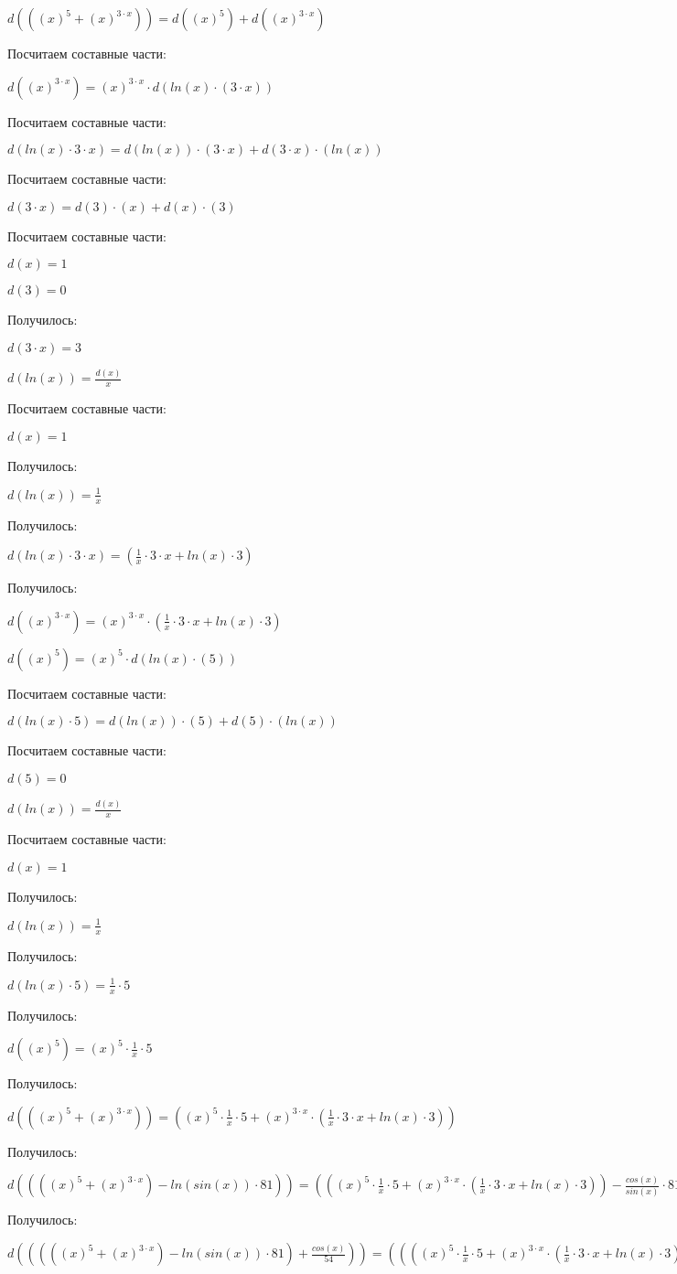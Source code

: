 \documentclass{article}
\begin{document}
$ d(((x)^{5}+(x)^{3 \cdot x})) = d((x)^{5}) + d((x)^{3 \cdot x})$

Посчитаем составные части:

$ d((x)^{3 \cdot x}) = (x)^{3 \cdot x} \cdot d(ln(x) \cdot (3 \cdot x))$

Посчитаем составные части:

$ d(ln(x) \cdot 3 \cdot x) = d(ln(x)) \cdot (3 \cdot x) + d(3 \cdot x) \cdot (ln(x))$

Посчитаем составные части:

$ d(3 \cdot x) = d(3) \cdot (x) + d(x) \cdot (3)$

Посчитаем составные части:

$ d(x) = 1$

$ d(3) = 0$

Получилось:

$ d(3 \cdot x) = 3$

$ d(ln(x)) = \frac{d(x)}{x}$

Посчитаем составные части:

$ d(x) = 1$

Получилось:

$ d(ln(x)) = \frac{1}{x}$

Получилось:

$ d(ln(x) \cdot 3 \cdot x) = (\frac{1}{x} \cdot 3 \cdot x+ln(x) \cdot 3)$

Получилось:

$ d((x)^{3 \cdot x}) = (x)^{3 \cdot x} \cdot (\frac{1}{x} \cdot 3 \cdot x+ln(x) \cdot 3)$

$ d((x)^{5}) = (x)^{5} \cdot d(ln(x) \cdot (5))$

Посчитаем составные части:

$ d(ln(x) \cdot 5) = d(ln(x)) \cdot (5) + d(5) \cdot (ln(x))$

Посчитаем составные части:

$ d(5) = 0$

$ d(ln(x)) = \frac{d(x)}{x}$

Посчитаем составные части:

$ d(x) = 1$

Получилось:

$ d(ln(x)) = \frac{1}{x}$

Получилось:

$ d(ln(x) \cdot 5) = \frac{1}{x} \cdot 5$

Получилось:

$ d((x)^{5}) = (x)^{5} \cdot \frac{1}{x} \cdot 5$

Получилось:

$ d(((x)^{5}+(x)^{3 \cdot x})) = ((x)^{5} \cdot \frac{1}{x} \cdot 5+(x)^{3 \cdot x} \cdot (\frac{1}{x} \cdot 3 \cdot x+ln(x) \cdot 3))$

Получилось:

$ d((((x)^{5}+(x)^{3 \cdot x})-ln(sin(x)) \cdot 81)) = (((x)^{5} \cdot \frac{1}{x} \cdot 5+(x)^{3 \cdot x} \cdot (\frac{1}{x} \cdot 3 \cdot x+ln(x) \cdot 3))-\frac{cos(x)}{sin(x)} \cdot 81)$

Получилось:

$ d(((((x)^{5}+(x)^{3 \cdot x})-ln(sin(x)) \cdot 81)+\frac{cos(x)}{54})) = ((((x)^{5} \cdot \frac{1}{x} \cdot 5+(x)^{3 \cdot x} \cdot (\frac{1}{x} \cdot 3 \cdot x+ln(x) \cdot 3))-\frac{cos(x)}{sin(x)} \cdot 81)+\frac{-1 \cdot sin(x) \cdot 54}{2916})$
\end{document}
